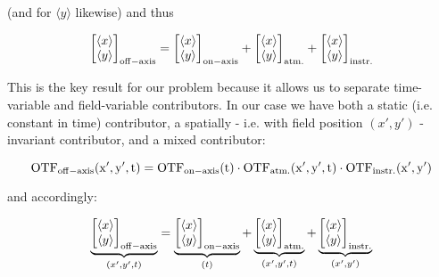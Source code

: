 (and for $\langle y \rangle$ likewise) and thus
 
\begin{equation}
\begin{bmatrix}
        \langle x \rangle \\ \langle y \rangle \end{bmatrix}_{\rm{off-axis}} = \begin{bmatrix} \langle x \rangle \\ \langle y \rangle\end{bmatrix}_{\rm{on-axis}} + \begin{bmatrix}\langle x \rangle \\ \langle y \rangle\end{bmatrix}_{\rm{atm.}} + \begin{bmatrix}\langle x \rangle \\ \langle y \rangle\end{bmatrix}_{\rm{instr.}}
\end{equation}

This is the key result for our problem because it allows us to separate time-variable and field-variable contributors. In our case we have both a static (i.e. constant in time) contributor, a spatially - i.e. with field position $(x',y')$ - invariant contributor, and a mixed contributor: 

\begin{equation}\label{dep}
\rm{OTF}_{\rm{off-axis}}(x',y',t)  =  \rm{OTF}_{\rm{on-axis}}(t)  \cdot  \rm{OTF}_{\rm{atm.}}(x',y',t)  \cdot  \rm{OTF}_{\rm{instr.}}(x',y')
\end{equation} 

and accordingly:

\begin{equation}
\underbrace{\begin{bmatrix}
        \langle x \rangle \\ \langle y \rangle \end{bmatrix}_{\rm{off-axis}}}_{(x',y',t)} = \underbrace{\begin{bmatrix} \langle x \rangle \\ \langle y \rangle\end{bmatrix}_{\rm{on-axis}}}_{(t)} + \underbrace{\begin{bmatrix}\langle x \rangle \\ \langle y \rangle\end{bmatrix}_{\rm{atm.}}}_{(x',y',t)} + \underbrace{\begin{bmatrix}\langle x \rangle \\ \langle y \rangle\end{bmatrix}_{\rm{instr.}}}_{(x',y')}
\end{equation}

